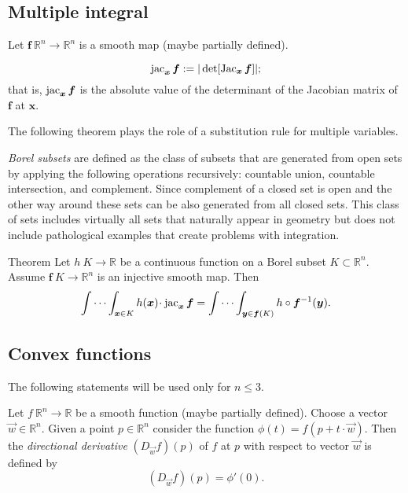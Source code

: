 \subsection*{Multiple integral}

Let $\bm{f}\:\mathbb{R}^n\to\mathbb{R}^n$ is a smooth map (maybe partially defined).

\[\jac_{\bm{x}}\bm{f}\df|\det[\Jac_{\bm{x}}\bm{f}]|;\index{10j@$\jac$}\]
that is, $\mathop{\rm jac}\nolimits_{\bm{x}}\bm{f}$ is the absolute value of the determinant of the Jacobian matrix of $\bm{f}$ at $\bm{x}$.

The following theorem plays the role of a substitution rule for multiple variables.

\emph{Borel subsets} are defined as the class of subsets that are generated from open sets by applying the following operations recursively: countable union, countable intersection, and complement.
Since complement of a closed set is open and the other way around these sets can be also generated from all closed sets.
This class of sets includes virtually all sets that naturally appear in geometry but does not include pathological examples that create problems with integration.



\begin{thm}{Theorem}\label{thm:mult-substitution} %
Let $h\:K\to\mathbb{R}$ be a continuous function on a Borel subset $K\subset \mathbb{R}^n$.
Assume $\bm{f}\:K\to \mathbb{R}^n$ is an injective smooth map.
Then 
\[\idotsint_{\bm{x}\in K} h(\bm{x})\cdot \jac_{\bm{x}}\bm{f}
=
\idotsint_{\bm{y}\in \bm{f}(K)} h\circ \bm{f}^{-1}(\bm{y}).\]

\end{thm}

\subsection*{Convex functions}

The following statements will be used only for $n\le 3$.

Let $f\:\mathbb{R}^n\to \mathbb{R}$ be a smooth function (maybe partially defined).
Choose a vector $\vec w\in \mathbb{R}^n$.
Given a point $p\in\mathbb{R}^n$ consider the function $\phi(t)=f(p+t\cdot \vec w)$.
Then the \emph{directional derivative} $(D_{\vec w}f)(p)$ of $f$ at $p$ with respect to vector $\vec w$ is defined by
\[(D_{\vec w}f)(p)=\phi'(0).\]

